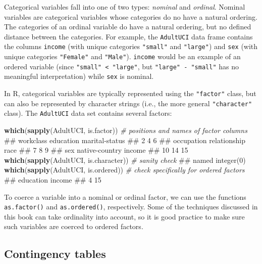 \documentclass[]{book}
\newenvironment{Shaded}{\begin{snugshade}}{\end{snugshade}}
\newcommand{\CommentTok}[1]{\textcolor[rgb]{0.56,0.35,0.01}{\textit{#1}}}
\newcommand{\KeywordTok}[1]{\textcolor[rgb]{0.13,0.29,0.53}{\textbf{#1}}}
\newcommand{\NormalTok}[1]{#1}
\theoremstyle{definition}
\theoremstyle{definition}
\theoremstyle{definition}
\theoremstyle{remark}
\begin{document}
Categorical variables fall into one of two types: \emph{nominal} and
\emph{ordinal}. Nominal variables are categorical variables whose
categories do no have a natural ordering. The categories of an ordinal
variable do have a natural ordering, but no defined distance between the
categories. For example, the \texttt{AdultUCI} data frame contains the
columns \texttt{income} (with unique categories \texttt{"small"} and
\texttt{"large"}) and \texttt{sex} (with unique categories
\texttt{"Female"} and \texttt{"Male"}). \texttt{income} would be an
example of an ordered variable (since
\texttt{"small"\ \textless{}\ "large"}, but \texttt{"large"\ -\ "small"}
has no meaningful interpretation) while \texttt{sex} is nominal.

In R, categorical variables are typically represented using the
\texttt{"factor"} class, but can also be represented by character
strings (i.e., the more general \texttt{"character"} class). The
\texttt{AdultUCI} data set contains several factors:

\begin{Shaded}
\begin{Highlighting}[]
\KeywordTok{which}\NormalTok{(}\KeywordTok{sapply}\NormalTok{(AdultUCI, is.factor))  }\CommentTok{# positions and names of factor columns}
\NormalTok{##      workclass      education marital-status }
\NormalTok{##              2              4              6 }
\NormalTok{##     occupation   relationship           race }
\NormalTok{##              7              8              9 }
\NormalTok{##            sex native-country         income }
\NormalTok{##             10             14             15}
\KeywordTok{which}\NormalTok{(}\KeywordTok{sapply}\NormalTok{(AdultUCI, is.character))  }\CommentTok{# sanity check}
\NormalTok{## named integer(0)}
\KeywordTok{which}\NormalTok{(}\KeywordTok{sapply}\NormalTok{(AdultUCI, is.ordered))  }\CommentTok{# check specifically for ordered factors}
\NormalTok{## education    income }
\NormalTok{##         4        15}
\end{Highlighting}
\end{Shaded}

To coerce a variable into a nominal or ordinal factor, we can use the
functions \texttt{as.factor()} and \texttt{as.ordered()}, respectively.
Some of the techniques discussed in this book can take ordinality into
account, so it is good practice to make sure such variables are coerced
to ordered factors.

\hypertarget{contingency-tables}{%
\subsection{Contingency tables}\label{contingency-tables}}
\end{document}
